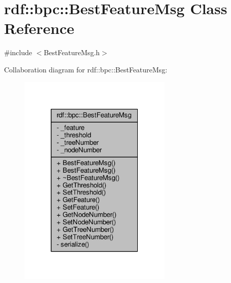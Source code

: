 \hypertarget{classrdf_1_1bpc_1_1BestFeatureMsg}{}\section{rdf\+:\+:bpc\+:\+:Best\+Feature\+Msg Class Reference}
\label{classrdf_1_1bpc_1_1BestFeatureMsg}


{\ttfamily \#include $<$Best\+Feature\+Msg.\+h$>$}



Collaboration diagram for rdf\+:\+:bpc\+:\+:Best\+Feature\+Msg\+:
\nopagebreak
\begin{figure}[H]
\begin{center}
\leavevmode
\includegraphics[width=208pt]{classrdf_1_1bpc_1_1BestFeatureMsg__coll__graph}
\end{center}
\end{figure}
